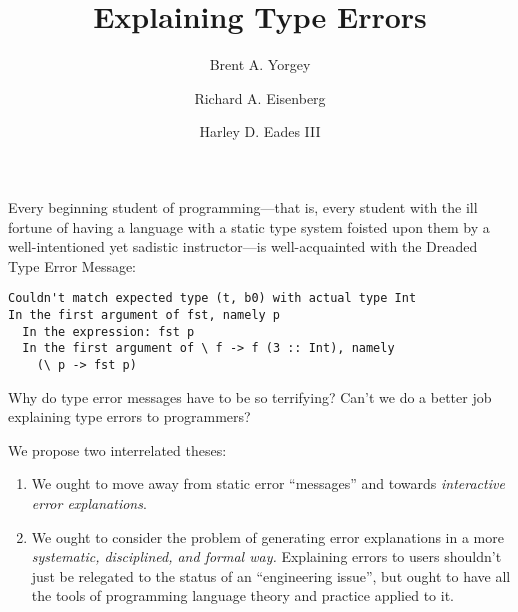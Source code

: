 \documentclass[sigplan, screen]{acmart}\settopmatter{printccs=false,printacmref=false}
\begin{document}
\title{Explaining Type Errors}

\author{Brent A. Yorgey}

\author{Richard A. Eisenberg}

\author{Harley D. Eades III}



\maketitle

Every beginning student of programming---that is, every student with
the ill fortune of having a language with a static type system foisted
upon them by a well-intentioned yet sadistic instructor---is
well-acquainted with the Dreaded Type Error Message:
{\small
\begin{verbatim}
Couldn't match expected type (t, b0) with actual type Int
In the first argument of fst, namely p
  In the expression: fst p
  In the first argument of \ f -> f (3 :: Int), namely
    (\ p -> fst p)
\end{verbatim}
}
Why do type error messages have to be so terrifying?  Can't we do a
better job explaining type errors to programmers?

We propose two interrelated theses:
\begin{enumerate}
\item We ought to move away from static error ``messages'' and towards
  \emph{interactive error explanations}.
\item We ought to consider the problem of generating error
  explanations in a more \emph{systematic, disciplined, and formal way.}
  Explaining errors to users shouldn't just be relegated to the status
  of an ``engineering issue'', but ought to have all the tools of
  programming language theory and practice applied to it.
\end{enumerate}
\end{document}
